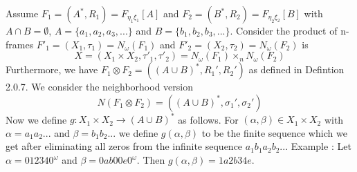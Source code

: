 \documentclass[12pt, a4paper]{scrartcl}
\begin{document}
    Assume $F_1 = (A^*,R_1) = F_{\eta_1 \xi_1}[A]$ and $F_2 = (B^*,R_2) = F_{\eta_2 \xi_2}[B]$ 
    with $A \cap B = \emptyset$, $A = \{a_1,a_2,a_3,...\}$ and $B = \{b_1,b_2,b_3,...\}$. 
    Consider the product of n-frames $F'_1 = (X_1, \tau_1) = N_\omega(F_1)$ and $F'_2 = (X_2, \tau_2) = N_\omega(F_2)$ is 
    $$X = (X_1 \times X_2, \tau'_1, \tau'_2) = N_\omega(F_1) \times_n N_\omega(F_2)$$ \newline
    Furthermore, we have $F_1 \otimes F_2 = ((A \cup B)^*, R_1', R_2')$ as defined in Defintion 2.0.7.
    We consider the neighborhood version $$N(F_1 \otimes F_2) = ((A \cup B)^*, \sigma_1', \sigma_2')$$ \newline
    Now we define $g : X_1 \times X_2 \rightarrow (A \cup B)^*$ as follows. For $(\alpha, \beta) \in X_1 \times X_2$ with $\alpha = a_1a_2...$ and $\beta = b_1b_2...$
    we define $g(\alpha,\beta)$ to be the finite sequence which we get after eliminating all zeros from the infinite sequence
    $a_1b_1a_2b_2...$ \newline \newline
    Example : Let $\alpha = 012340^\omega$  and $\beta = 0ab00e0^\omega$. Then $g(\alpha, \beta) = 1a2b34e$.
\end{document}

